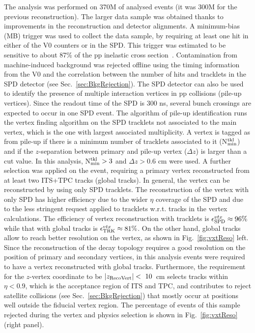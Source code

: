 The analysis was performed on 370M of analysed events (it was 300M for the previous
reconstruction). The larger data sample was obtained thanks to improvements in the reconstruction
and detector alignments.
 A minimum-bias (MB)
trigger was used to collect the data sample, by requiring
at least one hit in either of the V0 counters or in the SPD.
This trigger was estimated to be sensitive to about 87\% of the pp inelastic
cross section~\cite{Gagliardi:2011he}. 
 Contamination from machine-induced background was rejected 
 offline using the timing information from the V0 and the correlation 
 between the number of hits and tracklets in the SPD
detector (see Sec.~\ref{sec:BkgRejection}).
 The SPD detector can also be used to identify the presence of multiple interaction
vertices in pp collisions (pile-up vertices). Since the readout time of the SPD is
300 ns, several bunch crossings are expected to occur in one SPD event.
The algorithm of pile-up identification runs the vertex finding algorithm 
on the SPD tracklets not associated to the
main vertex, which is the one with largest associated multiplicity. 
A vertex is tagged as from pile-up if there is a minimum number of 
tracklets associated to it (N$^{\rm tkl}_{\rm min}$) and if the 
$z$-separation between primary and pile-up vertex ($\Delta z$) is larger than a cut value.
In this analysis, N$^{\rm tkl}_{\rm min}>3$ and $\Delta z>0.6$ cm were used.
A further selection was applied on the event, requiring a primary vertex 
reconstructed from at least two ITS+TPC tracks (global tracks). In general, the vertex can be reconstructed by
using only SPD tracklets. The reconstruction of the vertex 
with only SPD has higher efficiency due to the wider $\eta$
coverage of the SPD and due to the less stringent request applied to tracklets w.r.t. tracks in
the vertex calculations. The efficiency of vertex reconstruction with 
tracklets is $\epsilon^{vtx}_{\rm SPD} \approx 96\%$ while that with global tracks
is $\epsilon^{vtx}_{\rm TRK} \approx 81\%$. On the other hand, global tracks
allow to reach better resolution on the vertex, as shown in Fig.~\ref{fig:vxtReso} left.
Since the reconstruction of the decay topology 
requires a good resolution on the position of primary and secondary vertices,
in this analysis events were required to have a vertex reconstructed with global tracks.
Furthermore, the requirement for the $z$-vertex coordinate to be $|z_{\rm RecoVert}|<~10$~cm 
selects tracks within $\eta < 0.9$, which is the acceptance region of ITS and TPC,
and contributes to reject satellite collisions (see Sec.~\ref{sec:BkgRejection}) 
that mostly occur at positions well outside the fiducial vertex region. 
The percentage of events of this sample rejected during the vertex and physics selection
is shown in Fig.~\ref{fig:vxtReso} (right panel). 


